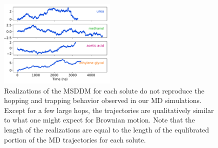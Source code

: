 \documentclass[12pt]{article}
\begin{document}
  \begin{figure}
  \centering
  \includegraphics[width=0.5\textwidth]{msddm_realizations.pdf}
  \caption{Realizations of the MSDDM for each solute do not reproduce the hopping
  and trapping behavior observed in our MD simulations. Except for a few large 
  hops, the trajectories are qualitatively similar to what one might expect for
  Brownian motion. Note that the length of the realizations are equal to the length
  of the equlibrated portion of the MD trajectories for each solute.}\label{fig:msddm_eyetest}
  \end{figure}
  
  
\end{document}
